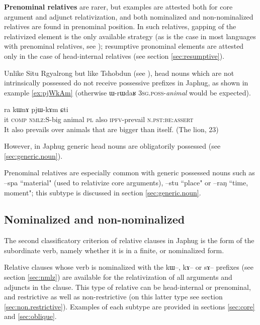 \documentclass[oldfontcommands,oneside,a4paper,11pt]{article}
\newcommand{\ipa}[1]{{\phon #1}} %
\begin{document}
  
  
\textbf{Prenominal relatives} are rarer, but examples are attested both for core argument and adjunct relativization, and both nominalized and non-nominalized relatives are found in prenominal position. In such relatives, gapping of the relativized element is the only available strategy (as is the case in most languages with prenominal relatives, see \citealt[587-8]{wu11prenominal}); resumptive pronominal elements are  attested only in the case of head-internal relatives (see section \ref{sec:resumptive}).

Unlike Situ Rgyalrong but like Tshobdun (see   \citealt[6]{jacksonlin07}), head nouns which are not intrinsically possessed do not receive possessive prefixes in Japhug, as shown in example \ref{ex:pjWkAm} (otherwise \ipa{ɯ-rɯdaʁ} \textsc{3sg.poss}-\textit{animal} would be expected).

\begin{exe}
\ex \label{ex:pjWkAm}
\gll
[\ipa{ɯʑo}  	\ipa{sɤz}  	\ipa{kɯ-wxti}]  	\ipa{rɯdaʁ}  	\ipa{ra}  	\ipa{kɯnɤ}  	\ipa{pjɯ-kɤm}  	\ipa{ɕti}  \\
it \textsc{comp} \textsc{nmlz}:S-big animal \textsc{pl} also \textsc{ipfv}-prevail \textsc{n.pst:be}:\textsc{assert} \\
\glt It also prevails over animals that are bigger than itself. (The lion, 23)
  \end{exe}
  However, in Japhug generic head nouns are obligatorily possessed (see \ref{sec:generic.noun}).
  
Prenominal relatives are especially common with generic possessed nouns such as \ipa{--spa} ``material" (used to relativize core arguments), \ipa{--stu} ``place" or \ipa{--raŋ} ``time, moment"; this subtype is discussed in section \ref{sec:generic.noun}.


\subsection{Nominalized and non-nominalized} \label{sec:nmlz.vs.n.nmlz}

The second classificatory criterion of relative clauses in Japhug is the form of the subordinate verb, namely whether it is in a finite, or nominalized form.


Relative clauses whose verb is nominalized with the \ipa{kɯ}--, \ipa{kɤ}-- or \ipa{sɤ}-- prefixes (see section \ref{sec:nmlz}) are available for the relativization of all arguments and adjuncts in the clause. This type of relative can be head-internal or prenominal, and restrictive as well as non-restrictive (on this latter type see section \ref{sec:non.restrictive}). Examples of each subtype are provided in sections \ref{sec:core} and \ref{sec:oblique}.
\end{document}
